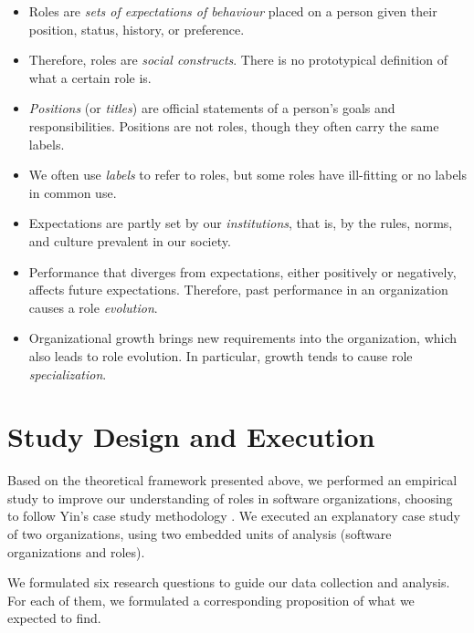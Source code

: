 \documentclass[10pt, conference, compsocconf]{IEEEtran}
\begin{document}
\begin{itemize}
\item Roles are \emph{sets of expectations of behaviour} placed on a person given their position, status, history, or preference.

\item Therefore, roles are \emph{social constructs}. There is no prototypical definition of what a certain role is.

\item \emph{Positions} (or \emph{titles}) are official statements of a person's goals and responsibilities. Positions are not roles, though they often carry the same labels.

\item We often use \emph{labels} to refer to roles, but some roles have ill-fitting or no labels in common use.

\item Expectations are partly set by our \emph{institutions}, that is, by the rules, norms, and culture prevalent in our society.

\item Performance that diverges from expectations, either positively or negatively, affects future expectations. Therefore, past performance in an organization causes a role \emph{evolution}.

\item Organizational growth brings new requirements into the organization, which also leads to role evolution. In particular, growth tends to cause role \emph{specialization}.
\end{itemize}




\section{Study Design and Execution}

Based on the theoretical framework presented above, we performed an empirical study to improve our understanding of roles in software organizations, choosing to follow Yin's case study methodology \cite{Yin2003}. We executed an explanatory case study of two organizations, using two embedded units of analysis (software organizations and roles).

We formulated six research questions to guide our data collection and analysis. For each of them, we formulated a corresponding proposition of what we expected to find.
\end{document}
